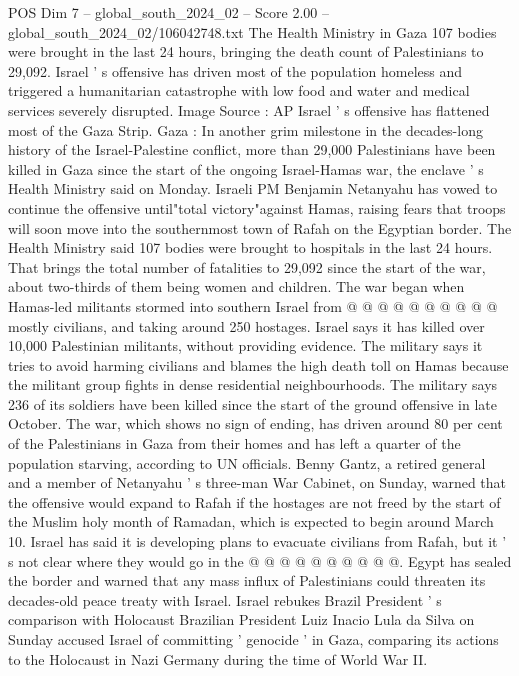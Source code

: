 \begin{textsample}{POS Dim 7 – global\_south\_2024\_02 – Score 2.00 – global\_south\_2024\_02/106042748.txt}  \label{ex:f7_pos_059}
The Health Ministry in Gaza 107 bodies were brought in the last 24 hours, bringing the death count of Palestinians to 29,092.
Israel ' s offensive has driven most of the population homeless and triggered a humanitarian catastrophe with low food and water and medical services severely disrupted.
Image Source : AP Israel ' s offensive has flattened most of the Gaza Strip.
Gaza : In another grim milestone in the decades-long history of the Israel-Palestine conflict, more than 29,000 Palestinians have been killed in Gaza since the start of the ongoing Israel-Hamas war, the enclave ' s Health Ministry said on Monday.
Israeli PM Benjamin Netanyahu has vowed to continue the offensive until"total victory"against Hamas, raising fears that troops will soon move into the southernmost town of Rafah on the Egyptian border.
The Health Ministry said 107 bodies were brought to hospitals in the last 24 hours.
That brings the total number of fatalities to 29,092 since the start of the war, about two-thirds of them being women and children.
The war began when Hamas-led militants stormed into southern Israel from @ @ @ @ @ @ @ @ @ @ mostly civilians, and taking around 250 hostages.
Israel says it has killed over 10,000 Palestinian militants, without providing evidence.
The military says it tries to avoid harming civilians and blames the high death toll on Hamas because the militant group fights in dense residential neighbourhoods.
The military says 236 of its soldiers have been killed since the start of the ground offensive in late October.
The war, which shows no sign of ending, has driven around 80 per cent of the Palestinians in Gaza from their homes and has left a quarter of the population starving, according to UN officials.
Benny Gantz, a retired general and a member of Netanyahu ' s three-man War Cabinet, on Sunday, warned that the offensive would expand to Rafah if the hostages are not freed by the start of the Muslim holy month of Ramadan, which is expected to begin around March 10.
Israel has said it is developing plans to evacuate civilians from Rafah, but it ' s not clear where they would go in the @ @ @ @ @ @ @ @ @ @.
Egypt has sealed the border and warned that any mass influx of Palestinians could threaten its decades-old peace treaty with Israel.
Israel rebukes Brazil President ' s comparison with Holocaust Brazilian President Luiz Inacio Lula da Silva on Sunday accused Israel of committing ' genocide ' in Gaza, comparing its actions to the Holocaust in Nazi Germany during the time of World War II.

\end{textsample}
